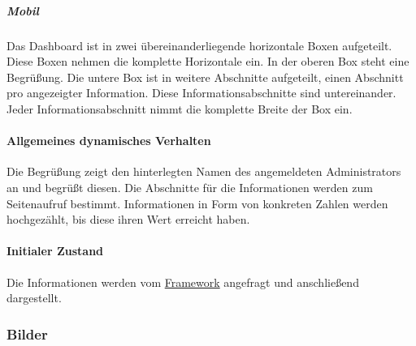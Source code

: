 \subparagraph*{Mobil}
Das Dashboard ist in zwei übereinanderliegende horizontale Boxen aufgeteilt. Diese Boxen nehmen die komplette Horizontale ein.
In der oberen Box steht eine Begrüßung.
Die untere Box ist in weitere Abschnitte aufgeteilt, einen Abschnitt pro angezeigter Information.
Diese Informationsabschnitte sind untereinander.
Jeder Informationsabschnitt nimmt die komplette Breite der Box ein.

\paragraph*{Allgemeines dynamisches Verhalten}
Die Begrüßung zeigt den hinterlegten Namen des angemeldeten Administrators an und begrüßt diesen.
Die Abschnitte für die Informationen werden zum Seitenaufruf bestimmt. 
Informationen in Form von konkreten Zahlen werden hochgezählt, bis diese ihren Wert erreicht haben.

\paragraph*{Initialer Zustand}
Die Informationen werden vom \hyperref[AP_Framework]{Framework} angefragt und anschließend dargestellt.

\subsubsection*{Bilder}
\begin{minipage}{\linewidth}
    \centering
    \begin{minipage}{.69\textwidth}
        \captionsetup[figure]{labelformat=empty}
        \captionsetup[figure]{labelformat=default}
    \end{minipage}
    \begin{minipage}{.3\textwidth}
        \captionsetup[figure]{labelformat=empty}
        \captionsetup[figure]{labelformat=default}
    \end{minipage}
\end{minipage}